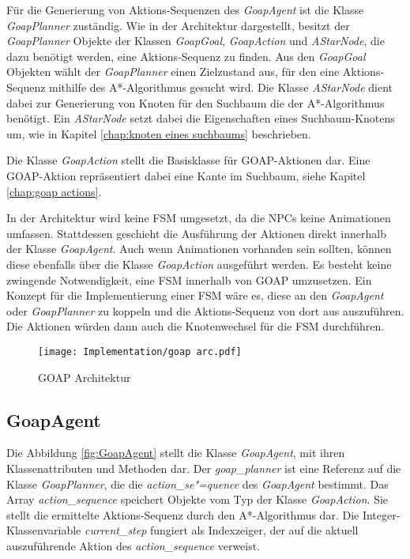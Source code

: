 Für die Generierung von Aktions-Sequenzen des \textit{GoapAgent} ist die Klasse \textit{GoapPlanner} zuständig. Wie in der Architektur dargestellt, besitzt der \textit{GoapPlanner} Objekte der Klassen \textit{GoapGoal}, \textit{GoapAction} und \textit{AStarNode}, die dazu benötigt werden, eine Aktions-Sequenz zu finden. Aus den \textit{GoapGoal} Objekten wählt der \textit{GoapPlanner} einen Zielzustand aus, für den eine Aktions-Sequenz mithilfe des A*-Algorithmus gesucht wird. Die Klasse \textit{AStarNode} dient dabei zur Generierung von Knoten für den Suchbaum die der A*-Algorithmus benötigt. Ein \textit{AStarNode} setzt dabei die Eigenschaften eines Suchbaum-Knotens um, wie in Kapitel \ref{chap:knoten eines suchbaums} beschrieben.

Die Klasse \textit{GoapAction} stellt die Basisklasse für GOAP-Aktionen dar. Eine GOAP-Aktion repräsentiert dabei eine Kante im Suchbaum, siehe Kapitel \ref{chap:goap actions}.

In der Architektur wird keine FSM umgesetzt, da die NPCs keine Animationen umfassen. Stattdessen geschieht die Ausführung der Aktionen direkt innerhalb der Klasse \textit{GoapAgent}. Auch wenn Animationen vorhanden sein sollten, können diese ebenfalls über die Klasse \textit{GoapAction} ausgeführt werden. Es besteht keine zwingende Notwendigkeit, eine FSM innerhalb von GOAP umzusetzen. Ein Konzept für die Implementierung einer FSM wäre es, diese an den \textit{GoapAgent} oder \textit{GoapPlanner} zu koppeln und die Aktions-Sequenz von dort aus auszuführen. Die Aktionen würden dann auch die Knotenwechsel für die FSM durchführen.

\begin{figure}[h]
  \centering
  \texttt{[image: Implementation/goap arc.pdf]}
	\captionsetup{justification=justified, format=plain}
  \caption{GOAP Architektur}
  \label{fig:GOAP Architektur}
\end{figure}







\subsection{GoapAgent}
\label{chap:goapagent uml}

Die Abbildung \ref{fig:GoapAgent} stellt die Klasse \textit{GoapAgent}, mit ihren Klassenattributen und Methoden dar. Der \textit{goap\_planner} ist eine Referenz auf die Klasse \textit{GoapPlanner}, die die \textit{action\_se"=quence} des \textit{GoapAgent} bestimmt. Das Array \textit{action\_sequence} speichert Objekte vom Typ der Klasse \textit{GoapAction}. Sie stellt die ermittelte Aktions-Sequenz durch den A*-Algorithmus dar. Die Integer-Klassenvariable \textit{current\_step} fungiert als Indexzeiger, der auf die aktuell auszuführende Aktion des \textit{action\_sequence} verweist.


